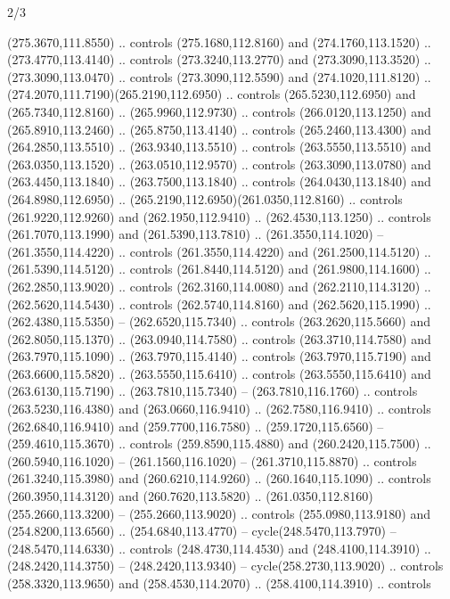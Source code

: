 \begin{flagdescription}{2/3}
\begin{scope}[xshift=0.5\flaglength,yshift=0.5\flagwidth,scale=\flagwidth/259.2]
\begin{scope}[y=0.8pt, x=0.8pt, yscale=-1,shift={(-243,-162)}]
      (275.3670,111.8550) .. controls (275.1680,112.8160) and (274.1760,113.1520) ..
      (273.4770,113.4140) .. controls (273.3240,113.2770) and (273.3090,113.3520) ..
      (273.3090,113.0470) .. controls (273.3090,112.5590) and (274.1020,111.8120) ..
      (274.2070,111.7190)(265.2190,112.6950) .. controls (265.5230,112.6950) and
      (265.7340,112.8160) .. (265.9960,112.9730) .. controls (266.0120,113.1250) and
      (265.8910,113.2460) .. (265.8750,113.4140) .. controls (265.2460,113.4300) and
      (264.2850,113.5510) .. (263.9340,113.5510) .. controls (263.5550,113.5510) and
      (263.0350,113.1520) .. (263.0510,112.9570) .. controls (263.3090,113.0780) and
      (263.4450,113.1840) .. (263.7500,113.1840) .. controls (264.0430,113.1840) and
      (264.8980,112.6950) .. (265.2190,112.6950)(261.0350,112.8160) .. controls
      (261.9220,112.9260) and (262.1950,112.9410) .. (262.4530,113.1250) .. controls
      (261.7070,113.1990) and (261.5390,113.7810) .. (261.3550,114.1020) --
      (261.3550,114.4220) .. controls (261.3550,114.4220) and (261.2500,114.5120) ..
      (261.5390,114.5120) .. controls (261.8440,114.5120) and (261.9800,114.1600) ..
      (262.2850,113.9020) .. controls (262.3160,114.0080) and (262.2110,114.3120) ..
      (262.5620,114.5430) .. controls (262.5740,114.8160) and (262.5620,115.1990) ..
      (262.4380,115.5350) -- (262.6520,115.7340) .. controls (263.2620,115.5660) and
      (262.8050,115.1370) .. (263.0940,114.7580) .. controls (263.3710,114.7580) and
      (263.7970,115.1090) .. (263.7970,115.4140) .. controls (263.7970,115.7190) and
      (263.6600,115.5820) .. (263.5550,115.6410) .. controls (263.5550,115.6410) and
      (263.6130,115.7190) .. (263.7810,115.7340) -- (263.7810,116.1760) .. controls
      (263.5230,116.4380) and (263.0660,116.9410) .. (262.7580,116.9410) .. controls
      (262.6840,116.9410) and (259.7700,116.7580) .. (259.1720,115.6560) --
      (259.4610,115.3670) .. controls (259.8590,115.4880) and (260.2420,115.7500) ..
      (260.5940,116.1020) -- (261.1560,116.1020) -- (261.3710,115.8870) .. controls
      (261.3240,115.3980) and (260.6210,114.9260) .. (260.1640,115.1090) .. controls
      (260.3950,114.3120) and (260.7620,113.5820) ..
      (261.0350,112.8160)(255.2660,113.3200) -- (255.2660,113.9020) .. controls
      (255.0980,113.9180) and (254.8200,113.6560) .. (254.6840,113.4770) --
      cycle(248.5470,113.7970) -- (248.5470,114.6330) .. controls
      (248.4730,114.4530) and (248.4100,114.3910) .. (248.2420,114.3750) --
      (248.2420,113.9340) -- cycle(258.2730,113.9020) .. controls
      (258.3320,113.9650) and (258.4530,114.2070) .. (258.4100,114.3910) .. controls

\end{scope}
\end{scope}
\end{flagdescription}
